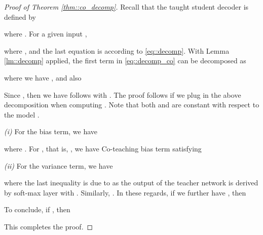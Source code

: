 \documentclass[journal]{IEEEtran}
\begin{document}
\begin{proof} [Proof of Theorem \ref{thm::co_decomp}]
    Recall that the taught student decoder is defined by
    
    where .
    For a given input ,
    
    where , and the last equation is according to \eqref{eq::decomp}.
    With Lemma \ref{lm::decomp} applied, the first term in \eqref{eq::decomp_co} can be decomposed as
    
    where we have , and also 
    
    Since , then we have  follows
     with .
    The proof follows if we plug in the above decomposition when computing .
    Note that both  and  are constant with respect to the model . 
    
    \textit{(i)} For the bias term, we have
    
    where .
    For , that is, , we have Co-teaching bias term satisfying 
    
    
    \textit{(ii)} For the variance term, we have
    
    where the last inequality is due to  as the output of the teacher network is derived by soft-max layer with . 
    Similarly, .
    In these regards, if we further have , then
    
    To conclude, if , then 
    
    This completes the proof.
\end{proof} 
\end{document}
